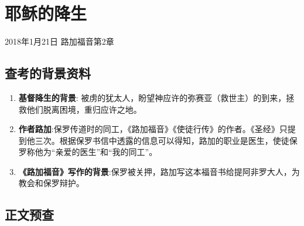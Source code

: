 \chapter{\chapFont 耶稣的降生}

2018年1月21日 \hfill 路加福音第2章


\section{查考的背景资料}

\begin{enumerate}
  \item \textbf{基督降生的背景}: 被虏的犹太人，盼望神应许的弥赛亚（救世主）的到来，拯救他们脱离困境，重归应许之地。\\
  \item \textbf{作者路加}:保罗传道时的同工，《路加福音》《使徒行传》的作者。《圣经》只提到他三次。根据保罗书信中透露的信息可以得知，路加的职业是医生，使徒保罗称他为“亲爱的医生”和“我的同工”\cite{wiki:Luke}。
  \item \textbf{《路加福音》写作的背景}:保罗被关押，路加写这本福音书给提阿非罗大人，为教会和保罗辩护。
\end{enumerate}

\section{正文预查}


